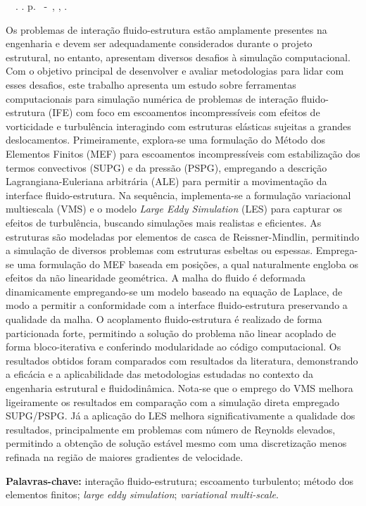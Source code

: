 \setlength{\absparsep}{18pt} %
\begin{resumo}
	\begin{flushleft}
		\setlength{\absparsep}{0pt} %
		\SingleSpacing
		\imprimirautorabr~~\textbf{\imprimirtituloresumo}.	\imprimirdata. \pageref{LastPage} p.
		\imprimirtipotrabalho~-~\imprimirinstituicao, \imprimirlocal, \imprimirdata.
	\end{flushleft}
	\OnehalfSpacing

	Os problemas de interação fluido-estrutura estão amplamente presentes na engenharia e devem ser adequadamente considerados durante o projeto estrutural, no entanto, apresentam diversos desafios à simulação computacional. Com o objetivo principal de desenvolver e avaliar metodologias para lidar com esses desafios, este trabalho apresenta um estudo sobre ferramentas computacionais para simulação numérica de problemas de interação fluido-estrutura (IFE) com foco em escoamentos incompressíveis com efeitos de vorticidade e turbulência interagindo com estruturas elásticas sujeitas a grandes deslocamentos. Primeiramente, explora-se uma formulação do Método dos Elementos Finitos (MEF) para escoamentos incompressíveis com estabilização dos termos convectivos (SUPG) e da pressão (PSPG), empregando a descrição Lagrangiana-Euleriana arbitrária (ALE) para permitir a movimentação da interface fluido-estrutura. Na sequência, implementa-se a formulação variacional multiescala (VMS) e o modelo \textit{Large Eddy Simulation} (LES) para capturar os efeitos de turbulência, buscando simulações mais realistas e eficientes. As estruturas são modeladas por elementos de casca de Reissner-Mindlin, permitindo a simulação de diversos problemas com estruturas esbeltas ou espessas. Emprega-se uma formulação do MEF baseada em posições, a qual naturalmente engloba os efeitos da não linearidade geométrica. A malha do fluido é deformada dinamicamente empregando-se um modelo baseado na equação de Laplace, de modo a permitir a conformidade com a interface fluido-estrutura preservando a qualidade da malha. O acoplamento fluido-estrutura é realizado de forma particionada forte, permitindo a solução do problema não linear acoplado de forma bloco-iterativa e conferindo modularidade ao código computacional. Os resultados obtidos foram comparados com resultados da literatura, demonstrando a eficácia e a aplicabilidade das metodologias estudadas no contexto da engenharia estrutural e fluidodinâmica. Nota-se que o emprego do VMS melhora ligeiramente os resultados em comparação com a simulação direta empregado SUPG/PSPG. Já a aplicação do LES melhora significativamente a qualidade dos resultados, principalmente em problemas com número de Reynolds elevados, permitindo a obtenção de solução estável mesmo com uma discretização menos refinada na região de maiores gradientes de velocidade.

	\textbf{Palavras-chave:} interação fluido-estrutura; escoamento turbulento; método dos elementos finitos; \textit{large eddy simulation}; \textit{variational multi-scale}.
\end{resumo}